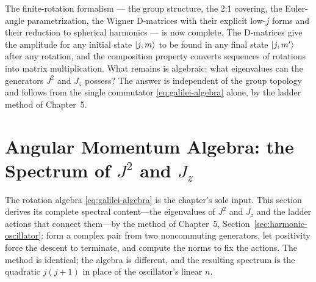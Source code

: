 The finite-rotation formalism --- the group structure, the 2:1 covering, the Euler-angle parametrization, the Wigner D-matrices with their explicit low-$j$ forms and their reduction to spherical harmonics --- is now complete. The D-matrices give the amplitude for any initial state $\ket{j,m}$ to be found in any final state $\ket{j,m'}$ after any rotation, and the composition property converts sequences of rotations into matrix multiplication. What remains is algebraic: what eigenvalues can the generators $J^{2}$ and $J_{z}$ possess? The answer is independent of the group topology and follows from the single commutator \eqref{eq:galilei-algebra} alone, by the ladder method of Chapter~5.

\section{Angular Momentum Algebra: the Spectrum of $J^2$ and $J_z$}
\label{sec:angular-momentum-algebra}

The rotation algebra \eqref{eq:galilei-algebra} is the chapter's sole input. This section derives its complete spectral content---the eigenvalues of $J^2$ and $J_z$ and the ladder actions that connect them---by the method of Chapter~5, Section~\ref{sec:harmonic-oscillator}: form a complex pair from two noncommuting generators, let positivity force the descent to terminate, and compute the norms to fix the actions. The method is identical; the algebra is different, and the resulting spectrum is the quadratic $j(j+1)$ in place of the oscillator's linear $n$.

